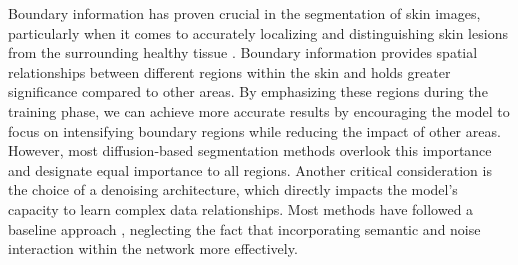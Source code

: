 \documentclass[runningheads]{llncs}
\begin{document}
Boundary information has proven crucial in the segmentation of skin images, particularly when it comes to accurately localizing and distinguishing skin lesions from the surrounding healthy tissue \cite{liu2022region,wang2021boundary,kervadec2019boundary}. Boundary information provides spatial relationships between different regions within the skin and holds greater significance compared to other areas. By emphasizing these regions during the training phase, we can achieve more accurate results by encouraging the model to focus on intensifying boundary regions while reducing the impact of other areas. However, most diffusion-based segmentation methods overlook this importance and designate equal importance to all regions. Another critical consideration is the choice of a denoising architecture, which directly impacts the model's capacity to learn complex data relationships. Most methods have followed a baseline approach \cite{ho2020denoising,nichol2021improved}, neglecting the fact that incorporating semantic and noise interaction within the network more effectively.
\end{document}
